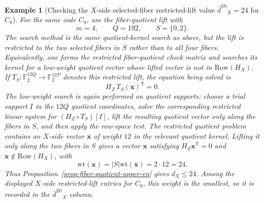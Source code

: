 \documentclass[11pt]{article}
\newcommand{\Ftwo}{\mathbb{F}_2}
\newcommand{\Row}{\mathrm{Row}}
\newcommand{\wt}{\mathrm{wt}}
\newcommand{\dbound}[1]{\ensuremath{\bar{d}^{\mathrm{#1}}}}
\newcommand{\dfib}{\dbound{fib}}
\newcommand{\markededit}[1]{#1}
\newcommand{\vect}[1]{\bm{#1}}
\newcommand{\vx}{\vect{x}}
\theoremstyle{uprightthm}
\newtheorem{example}[theorem]{Example}
\begin{document}
\begin{example}[Checking the $X$-side selected-fiber restricted-lift value \texorpdfstring{\(\dfib_X=24\)}{dbar-fib-X=24} for \(C_9\)]
For the same code $C_9$, use the fiber-quotient lift with
\[
m=4,\qquad Q=192,\qquad S=\{0,2\}.
\]
The search method is the same quotient-kernel search as above, but the lift is
restricted to the two selected fibers in $S$ rather than to all four fibers.
Equivalently, one forms the restricted fiber-quotient check matrix and
searches its kernel for a low-weight quotient vector whose lifted vector is not
in $\Row(H_X)$.  If $T_S:\Ftwo^{12Q}\to\Ftwo^{12P}$ denotes this restricted
lift, the equation being solved is
\[
H_Z\,T_S(\bar{\vx})^{\mathsf T}=0.
\]
The low-weight search is again performed on quotient supports: choose a trial
support $I$ in the $12Q$ quotient coordinates, solve the corresponding
restricted linear system for $(H_Z\circ T_S)[I]$, lift the resulting quotient
vector only along the fibers in $S$, and then apply the row-space test.
The restricted quotient problem contains an $X$-side vector
$\bar{\vx}$ of weight $12$ in the relevant quotient kernel.  Lifting it only
along the two fibers in $S$ gives a vector $\vx$ satisfying
$H_Z\vx^{\mathsf T}=0$ and $\vx\notin\Row(H_X)$, with
\[
\wt(\vx)=|S|\wt(\bar{\vx})=2\cdot 12=24.
\]
Thus Proposition~\ref{prop:fiber-quotient-upper-en} gives $d_X\le 24$.
Among the displayed $X$-side restricted-lift entries for $C_9$, \markededit{this}
weight is the smallest, so it is recorded in the $\dfib_X$ column.
\end{example}
\end{document}
